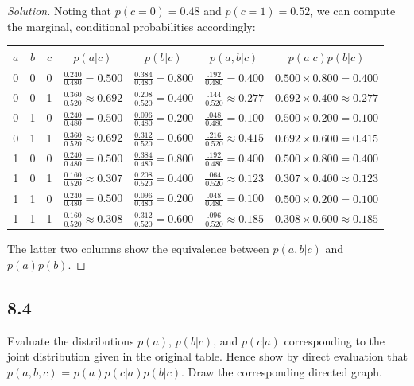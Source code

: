 \documentclass[11pt, oneside]{article}\usepackage[]{graphicx}\usepackage[]{color}
\newenvironment{solution}
  {\begin{proof}[Solution]}
  {\end{proof}}
\begin{document}
\begin{solution}
Noting that $p(c=0) = 0.48$ and $p(c=1) = 0.52$, we can compute the marginal, conditional probabilities accordingly:

  \begin{table}[h!]
  \centering
  \begin{tabular}{ |c|c|c|c|c|c|c| }
  \hline
  $a$ & $b$ & $c$ & $p(a|c)$ & $p(b|c)$ & $p(a, b|c)$ & $p(a|c)p(b|c)$ \\
  \hline
  \rule{0pt}{3ex} 0 & 0 & 0 & $\frac{0.240}{0.480}=0.500$ & $\frac{0.384}{0.480}=0.800$ & $\frac{.192}{0.480} = 0.400$ & $0.500\times0.800= 0.400$ \\
  \rule{0pt}{3ex} 0 & 0 & 1 & $\frac{0.360}{0.520}\approx0.692$ & $\frac{0.208}{0.520}=0.400$ & $\frac{.144}{0.520}\approx 0.277$ & $0.692\times0.400\approx0.277$ \\
  \rule{0pt}{3ex} 0 & 1 & 0 & $\frac{0.240}{0.480} = 0.500$ & $\frac{0.096}{0.480} = 0.200$ & $\frac{.048}{0.480} = 0.100$ & $0.500\times0.200=0.100$ \\
  \rule{0pt}{3ex} 0 & 1 & 1 & $\frac{0.360}{0.520} \approx 0.692$ & $\frac{0.312}{0.520} = 0.600$ & $\frac{.216}{0.520} \approx 0.415$ & $0.692\times0.600=0.415$ \\
  \rule{0pt}{3ex} 1 & 0 & 0 & $\frac{0.240}{0.480} = 0.500$ & $\frac{0.384}{0.480} = 0.800$ & $\frac{.192}{0.480} = 0.400$ & $0.500\times0.800=0.400$ \\
  \rule{0pt}{3ex} 1 & 0 & 1 & $\frac{0.160}{0.520} \approx 0.307$ & $\frac{0.208}{0.520} = 0.400$ & $\frac{.064}{0.520} \approx 0.123$ & $0.307\times0.400\approx0.123$ \\
  \rule{0pt}{3ex} 1 & 1 & 0 & $\frac{0.240}{0.480} = 0.500$ & $\frac{0.096}{0.480} = 0.200$ & $\frac{.048}{0.480} = 0.100$ & $0.500\times0.200=0.100$ \\
  \rule{0pt}{3ex} 1 & 1 & 1 & $\frac{0.160}{0.520} \approx 0.308$ & $\frac{0.312}{0.520} = 0.600$ & $\frac{.096}{0.520} \approx 0.185$ & $0.308\times0.600\approx0.185$ \\
  \hline
  \end{tabular}
  \end{table}
  
The latter two columns show the equivalence between $p(a, b|c)$ and $p(a)p(b)$.

\end{solution}

\subsection*{8.4}
Evaluate the distributions $p(a)$, $p(b|c)$, and $p(c|a)$ corresponding to the joint
distribution given in the original table. Hence show by direct evaluation that $p(a, b, c)$ =
$p(a)p(c|a)p(b|c)$. Draw the corresponding directed graph.
\end{document}
